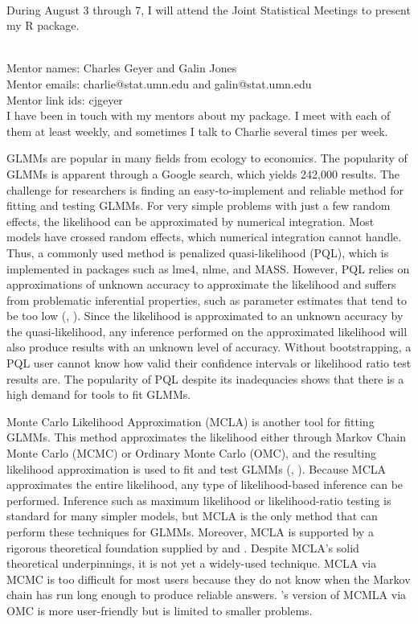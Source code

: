 \documentclass[12pt]{article}
\newcommand{\pcite}[1]{\citeauthor{#1}'s \citeyearpar{#1}}
\newcommand{\ncite}[1]{\citeauthor{#1}, \citeyear{#1}}
\begin{document}
\\
During August 3 through 7, I will  attend the Joint Statistical Meetings to present my R package.

 \medskip

\\
Mentor names: Charles Geyer and Galin Jones\\
Mentor emails: charlie@stat.umn.edu and galin@stat.umn.edu\\
Mentor link ids: cjgeyer\\
I have been in touch with my mentors about my package.  I meet with each of them at least weekly, and sometimes I talk to Charlie several times per week.  

 \medskip
{}

GLMMs are popular in many fields from ecology to economics. The popularity of GLMMs is apparent through a Google search, which yields  242,000 results. The challenge for researchers is finding an easy-to-implement and reliable method for fitting and testing GLMMs. For very simple problems with just a few random effects, the likelihood can be approximated by numerical integration.  Most models have crossed random effects, which numerical integration cannot handle. Thus, a commonly used method is penalized quasi-likelihood (PQL), which is  implemented in packages such as lme4, nlme, and MASS. However, PQL relies on approximations of unknown accuracy to approximate the likelihood and suffers from problematic inferential properties, such as parameter estimates that tend to be too low (\ncite{mccu:sear:2001}). Since the likelihood is approximated to an unknown accuracy by the quasi-likelihood, any inference performed on the approximated likelihood will also produce results with an unknown level of accuracy.  Without bootstrapping, a PQL user cannot know how valid their confidence intervals or likelihood ratio test results are.  The popularity of PQL despite its inadequacies shows that there is a high demand for tools to fit GLMMs.


Monte Carlo  Likelihood Approximation (MCLA) is another tool for fitting GLMMs. This method approximates the likelihood either through Markov Chain Monte Carlo (MCMC) or Ordinary Monte Carlo (OMC), and the resulting likelihood approximation is used to fit and test GLMMs (\ncite{geyer:thom:1992}).   Because MCLA approximates the entire likelihood, any type of likelihood-based inference can be performed.  Inference such as maximum likelihood or likelihood-ratio testing is standard for many simpler models, but MCLA is the only method that can perform these techniques for GLMMs.  Moreover, MCLA is supported by a rigorous theoretical foundation supplied by \citet{geyer:1994} and  \citet{sung:geyer:2007}. Despite MCLA's solid theoretical underpinnings, it is not yet a widely-used technique. MCLA via MCMC is  too difficult for most users because they do not know when the Markov chain has run long enough to produce reliable answers.  \pcite{sung:geyer:2007} version of MCMLA via OMC is more user-friendly but is limited to smaller problems.
\end{document}
